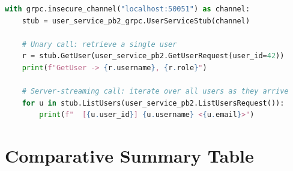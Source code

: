 \documentclass[11pt,a4paper]{article}
\begin{document}
\begin{lstlisting}[language=Python, style=codestyle,
                   caption={gRPC client --- unary and streaming calls (Python)}]
with grpc.insecure_channel("localhost:50051") as channel:
    stub = user_service_pb2_grpc.UserServiceStub(channel)

    # Unary call: retrieve a single user
    r = stub.GetUser(user_service_pb2.GetUserRequest(user_id=42))
    print(f"GetUser -> {r.username}, {r.role}")

    # Server-streaming call: iterate over all users as they arrive
    for u in stub.ListUsers(user_service_pb2.ListUsersRequest()):
        print(f"  [{u.user_id}] {u.username} <{u.email}>")
\end{lstlisting}

\section{Comparative Summary Table}
\end{document}

